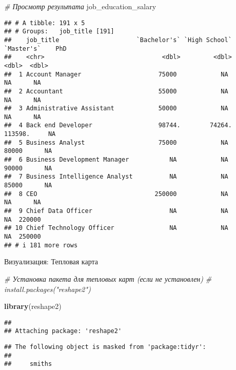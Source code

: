 \documentclass[
]{article}
\newenvironment{Shaded}{\begin{snugshade}}{\end{snugshade}}
\newcommand{\CommentTok}[1]{\textcolor[rgb]{0.56,0.35,0.01}{\textit{#1}}}
\newcommand{\FunctionTok}[1]{\textcolor[rgb]{0.13,0.29,0.53}{\textbf{#1}}}
\newcommand{\NormalTok}[1]{#1}
\begin{document}
\begin{Shaded}
\begin{Highlighting}[]
\CommentTok{\# Просмотр результата}
\NormalTok{job\_education\_salary}
\end{Highlighting}
\end{Shaded}

\begin{verbatim}
## # A tibble: 191 x 5
## # Groups:   job_title [191]
##    job_title                     `Bachelor's` `High School` `Master's`    PhD
##    <chr>                                <dbl>         <dbl>      <dbl>  <dbl>
##  1 Account Manager                     75000            NA         NA      NA
##  2 Accountant                          55000            NA         NA      NA
##  3 Administrative Assistant            50000            NA         NA      NA
##  4 Back end Developer                  98744.        74264.    113598.     NA
##  5 Business Analyst                    75000            NA      80000      NA
##  6 Business Development Manager           NA            NA      90000      NA
##  7 Business Intelligence Analyst          NA            NA      85000      NA
##  8 CEO                                250000            NA         NA      NA
##  9 Chief Data Officer                     NA            NA         NA  220000
## 10 Chief Technology Officer               NA            NA         NA  250000
## # i 181 more rows
\end{verbatim}

Визуализация: Тепловая карта

\begin{Shaded}
\begin{Highlighting}[]
\CommentTok{\# Установка пакета для тепловых карт (если не установлен)}
\CommentTok{\# install.packages("reshape2")}

\FunctionTok{library}\NormalTok{(reshape2)}
\end{Highlighting}
\end{Shaded}

\begin{verbatim}
## 
## Attaching package: 'reshape2'
\end{verbatim}

\begin{verbatim}
## The following object is masked from 'package:tidyr':
## 
##     smiths
\end{verbatim}
\end{document}
